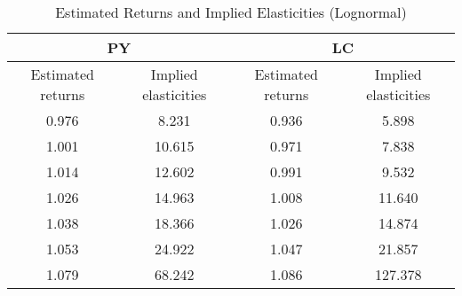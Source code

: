 \begin{table}[!htbp]
\centering
\caption{Estimated Returns and Implied Elasticities (Lognormal)}
\label{tab:returns_lognormal}
\begin{tabular}{|c|c|c|c|}
\hline
\multicolumn{2}{|c|}{PY} & \multicolumn{2}{|c|}{LC} \\
\hline
Estimated returns & Implied elasticities & Estimated returns & Implied elasticities \\
\hline
0.976 & 8.231 & 0.936 & 5.898 \\
1.001 & 10.615 & 0.971 & 7.838 \\
1.014 & 12.602 & 0.991 & 9.532 \\
1.026 & 14.963 & 1.008 & 11.640 \\
1.038 & 18.366 & 1.026 & 14.874 \\
1.053 & 24.922 & 1.047 & 21.857 \\
1.079 & 68.242 & 1.086 & 127.378 \\
\hline
\end{tabular}
\end{table}
